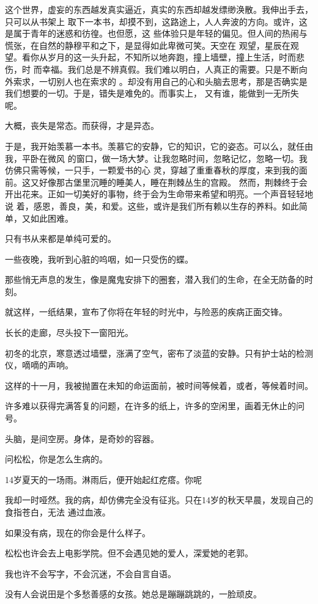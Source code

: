 \documentclass[12pt,a4paper]{article}
\begin{document}
		这个世界，虚妄的东西越发真实逼近，真实的东西却越发缥缈涣散。我伸出手去，只可以从书架上
	取下一本书，却摸不到，这路途上，人人奔波的方向。或许，这是属于青年的迷惑和彷徨。也但愿，这
	些体验只是年轻的偏见。但人间的热闹与慌张，在自然的静穆平和之下，是显得如此卑微可笑。天空在
	观望，星辰在观望。看你从岁月的这一头升起，不知所以地奔跑，撞上墙壁，撞上生活，时而悲伤，时
	而幸福。我们总是不辨真假。我们难以明白，人真正的需要。只是不断向外索求，一切别人也在索求的
	。却没有用自己的心和头脑去思考，那是否确实是我们想要的一切。于是，错失是难免的。而事实上，
	又有谁，能做到一无所失呢。

		大概，丧失是常态。而获得，才是异态。

		于是，我开始羡慕一本书。羡慕它的安静，它的知识，它的姿态。可以么，就任由我，平卧在微风
	的窗口，做一场大梦。让我忽略时间，忽略记忆，忽略一切。我仿佛只需等候，一只手，一颗爱书的心
	灵，穿越了重重春秋的厚度，来到我的面前。这又好像那古堡里沉睡的睡美人，睡在荆棘丛生的宫殿。
	然而，荆棘终于会开出花来。正如一切美好的事物，终于会为生命带来希望和明亮。一个声音轻轻地说
	着，感恩，善良，美，和爱。这些，或许是我们所有赖以生存的养料。如此简单，又如此困难。


		只有书从来都是单纯可爱的。

	\endwriting



		一些夜晚，我听到心脏的呜咽，如一只受伤的蝶。\par
		那些悄无声息的发生，像是魔鬼安排下的圈套，潜入我们的生命，在全无防备的时刻。\par
		就这样，一纸结果，宣布了你将在年轻的时光中，与险恶的疾病正面交锋。\par
		长长的走廊，尽头投下一窗阳光。\par
		初冬的北京，寒意透过墙壁，涨满了空气，密布了淡蓝的安静。只有护士站的检测仪，嘀嘀的声响。\par
		这样的十一月，我被抛置在未知的命运面前，被时间等候着，或者，等候着时间。\par
		许多难以获得完满答复的问题，在许多的纸上，许多的空闲里，画着无休止的问号。\par
		头脑，是间空房。身体，是奇妙的容器。\par
		问松松，你是怎么生病的。\par
		14岁夏天的一场雨。淋雨后，便开始起红疙瘩。你呢

		我却一时哑然。我的病，却仿佛完全没有征兆。只在14岁的秋天早晨，发现自己的食指苍白，无法
	通过血液。

		如果没有病，现在的你会是什么样子。\par
		松松也许会去上电影学院。但不会遇见她的爱人，深爱她的老郭。\par
		我也许不会写字，不会沉迷，不会自言自语。\par
		没有人会说田是个多愁善感的女孩。她总是蹦蹦跳跳的，一脸顽皮。
\end{document}
